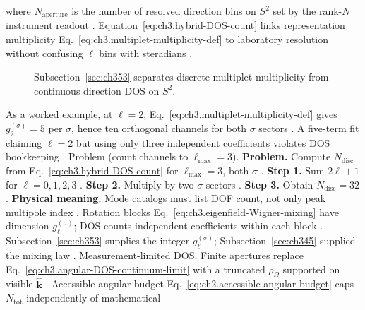 where \(N_{\mathrm{aperture}}\) is the number of resolved direction bins on \(S^{2}\) set by the rank-$N$ instrument readout
\cite{harrington2001}. Equation~\eqref{eq:ch3.hybrid-DOS-count} links representation
multiplicity Eq.~\eqref{eq:ch3.multiplet-multiplicity-def} to laboratory resolution without confusing \(\ell\) bins
with steradians \cite{hansen1988}.
\begin{figure}[t]
\centering
{}
\caption{Subsection~\ref{sec:ch353} separates discrete multiplet multiplicity from continuous direction DOS on \(S^{2}\).}
\label{fig:ch3.353-dos-split}
\end{figure}
As a worked example, at \(\ell=2\), Eq.~\eqref{eq:ch3.multiplet-multiplicity-def} gives \(g_{2}^{(\sigma)}=5\) per \(\sigma\), hence ten
orthogonal channels for both \(\sigma\) sectors \cite{jackson1999}. A five-term fit claiming \(\ell=2\) but
using only three independent coefficients violates DOS bookkeeping \cite{harrington2001}.
Problem (count channels to \(\ell_{\max}=3\)). \textbf{Problem.} Compute \(N_{\mathrm{disc}}\) from Eq.~\eqref{eq:ch3.hybrid-DOS-count} for \(\ell_{\max}=3\), both
\(\sigma\) \cite{jackson1999}.
\textbf{Step 1.} Sum \(2\ell+1\) for \(\ell=0,1,2,3\) \cite{jackson1999}.
\textbf{Step 2.} Multiply by two \(\sigma\) sectors \cite{belinfante1940}.
\textbf{Step 3.} Obtain \(N_{\mathrm{disc}}=32\) \cite{hansen1988}.
\textbf{Physical meaning.} Mode catalogs must list DOF count, not only peak multipole index \cite{harrington2001}.
Rotation blocks Eq.~\eqref{eq:ch3.eigenfield-Wigner-mixing} have dimension \(g_{\ell}^{(\sigma)}\); DOS counts
independent coefficients within each block \cite{jackson1999}. Subsection~\ref{sec:ch353} supplies the
integer \(g_{\ell}^{(\sigma)}\); Subsection~\ref{sec:ch345} supplied the mixing law \cite{stratton1941}.
Measurement-limited DOS. Finite apertures replace Eq.~\eqref{eq:ch3.angular-DOS-continuum-limit} with a truncated
\(\rho_{\Omega}\) supported on visible \(\hat{\mathbf{k}}\) \cite{harrington2001}. Accessible angular
budget Eq.~\eqref{eq:ch2.accessible-angular-budget} caps \(N_{\mathrm{tot}}\) independently of mathematical
